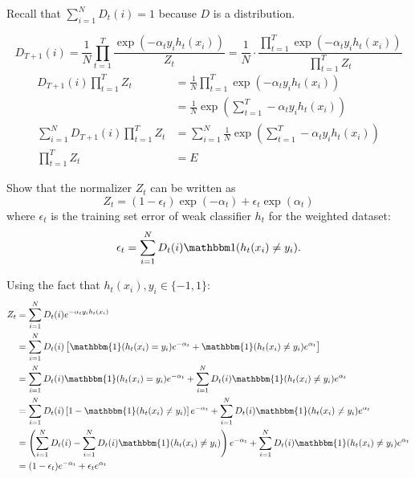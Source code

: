 \begin{hint}
	Recall that $\sum_{i = 1}^N D_t(i) = 1$ because $D$ is a distribution.
\end{hint}

\begin{solution}
    $$
    D_{T+1}(i) =
    \frac{1}{N} \prod_{t=1}^{T} \frac{\exp(-\alpha_t y_i h_t(x_i))}{Z_t} =
    \frac{1}{N} \cdot \frac{\prod_{t=1}^{T} \exp(-\alpha_t y_i h_t(x_i))}{\prod_{t=1}^{T} Z_t}
    $$
    \begin{align*}
        D_{T+1}(i) \prod_{t=1}^{T} Z_t &= \frac{1}{N} \prod_{t=1}^{T} \exp(-\alpha_t y_i h_t(x_i)) \\
        &= \frac{1}{N} \exp(\sum_{t=1}^T -\alpha_t y_i h_t(x_i)) \\
        \sum_{i=1}^N D_{T+1}(i) \prod_{t=1}^{T} Z_t &= \sum_{i=1}^N \frac{1}{N} \exp(\sum_{t=1}^T -\alpha_t y_i h_t(x_i)) \\
        \prod_{t=1}^{T} Z_t &= E
    \end{align*}
\end{solution}

\problem[5]
Show that the normalizer $Z_t$ can be written as
\[Z_t = (1 - \epsilon_t) \exp(-\alpha_t) + \epsilon_{t} \exp(\alpha_t)\]
where $\epsilon_t$ is the training set error of weak classifier $h_t$ for the weighted dataset:
\[\epsilon_t = \sum\limits_{i=1}^N D_t(i)\mathbbm1(h_t(x_i) \neq y_i).\]

\begin{solution}
    Using the fact that $h_t(x_i), y_i \in \{-1, 1\}$:
    \begin{align*}
        Z_t &= \sum_{i=1}^N D_t(i) e^{-\alpha_{t}y_{i}h_{t}(x_{i})} \\
        &= \sum_{i=1}^N D_t(i) \left[
            \mathbbm{1}(h_t(x_i) = y_i)e^{-\alpha_{t}} +
            \mathbbm{1}(h_t(x_i) \neq y_i)e^{\alpha_{t}}
            \right] \\
        &= \sum_{i=1}^N D_t(i) \mathbbm{1}(h_t(x_i) = y_i)e^{-\alpha_{t}} +
           \sum_{i=1}^N D_t(i) \mathbbm{1}(h_t(x_i) \neq y_i)e^{\alpha_{t}} \\
        &= \sum_{i=1}^N D_t(i) \left[1 - \mathbbm{1}(h_t(x_i) \neq y_i) \right] e^{-\alpha_{t}} +
           \sum_{i=1}^N D_t(i) \mathbbm{1}(h_t(x_i) \neq y_i)e^{\alpha_{t}} \\
        &= \left(\sum_{i=1}^N D_t(i) - \sum_{i=1}^N D_t(i) \mathbbm{1}(h_t(x_i) \neq y_i) \right) e^{-\alpha_{t}} +
           \sum_{i=1}^N D_t(i) \mathbbm{1}(h_t(x_i) \neq y_i)e^{\alpha_{t}} \\
        &= (1 - \epsilon_t) e^{-\alpha_t} + \epsilon_t e^{\alpha_t}
    \end{align*}
\end{solution}


